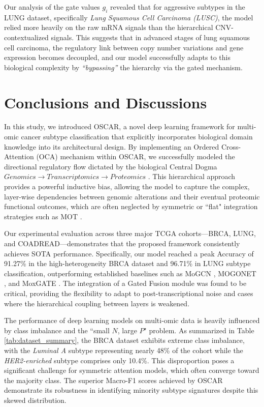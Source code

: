 \documentclass[lettersize,journal]{IEEEtran}
\begin{document}
Our analysis of the gate values $g_i$ revealed that for aggressive subtypes in the LUNG dataset, specifically \textit{Lung Squamous Cell Carcinoma (LUSC)}, the model relied more heavily on the raw mRNA signals than the hierarchical CNV-contextualized signals. This suggests that in advanced stages of lung squamous cell carcinoma, the regulatory link between copy number variations and gene expression becomes decoupled, and our model successfully adapts to this biological complexity by \textit{``bypassing''} the hierarchy via the gated mechanism.

\section{Conclusions and Discussions}

In this study, we introduced OSCAR, a novel deep learning framework for multi-omic cancer subtype classification that explicitly incorporates biological domain knowledge into its architectural design. By implementing an Ordered Cross-Attention (OCA) mechanism within OSCAR, we successfully modeled the directional regulatory flow dictated by the biological Central Dogma  $Genomics  \rightarrow Transcriptomics \rightarrow Proteomics$ . This hierarchical approach provides a powerful inductive bias, allowing the model to capture the complex, layer-wise dependencies between genomic alterations and their eventual proteomic functional outcomes, which are often neglected by symmetric or ``flat" integration strategies such as MOT \cite{MOT2023}.

Our experimental evaluation across three major TCGA cohorts—BRCA, LUNG, and COADREAD—demonstrates that the proposed framework consistently achieves SOTA performance. Specifically, our model reached a peak Accuracy of 91.27\% in the high-heterogeneity BRCA dataset and 96.71\% in LUNG subtype classification, outperforming established baselines such as MoGCN \cite{MoGCN2022}, MOGONET \cite{MOGONET2021}, and MoxGATE \cite{MoxGATE2023}. The integration of a Gated Fusion module was found to be critical, providing the flexibility to adapt to post-transcriptional noise and cases where the hierarchical coupling between layers is weakened.

The performance of deep learning models on multi-omic data is heavily influenced by class imbalance and the ``small $N$, large $P$" problem. As summarized in Table \ref{tab:dataset_summary}, the BRCA dataset exhibits extreme class imbalance, with the \textit{Luminal A} subtype representing nearly 48\% of the cohort while the \textit{HER2-enriched} subtype comprises only 10.4\%. This disproportion poses a significant challenge for symmetric attention models, which often converge toward the majority class. The superior Macro-F1 scores achieved by OSCAR demonstrate its robustness in identifying minority subtype signatures despite this skewed distribution.
\end{document}
